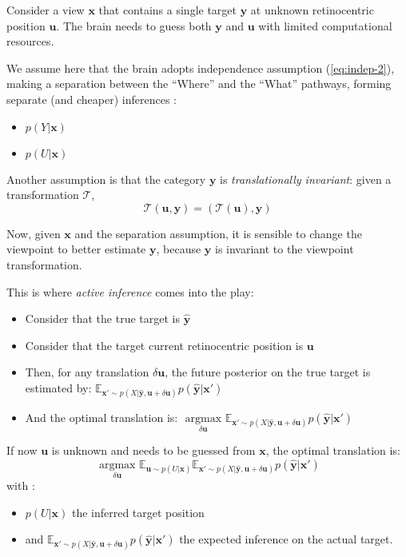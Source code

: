 Consider a view $\boldsymbol{x}$ that contains a single target $\boldsymbol{y}$ at unknown retinocentric position $\boldsymbol{u}$. The brain needs to guess both  $\boldsymbol{y}$ and $\boldsymbol{u}$ with limited computational resources.

We assume here that the brain adopts independence assumption (\ref{eq:indep-2}), making a separation between the ``Where'' and the ``What'' pathways, forming separate (and cheaper) inferences :
\begin{itemize}
\item $p(Y|\boldsymbol{x})$
\item $p(U|\boldsymbol{x})$
\end{itemize}

Another assumption is that the category $\boldsymbol{y}$ is \emph{translationally invariant}: given a transformation $\mathcal{T}$,
$$\mathcal{T}(\boldsymbol{u}, \boldsymbol{y})
= (\mathcal{T}(\boldsymbol{u}), \boldsymbol{y})$$

Now, given $\boldsymbol{x}$ and the separation assumption, it is sensible to change the viewpoint to better estimate $\boldsymbol{y}$, because  $\boldsymbol{y}$ is invariant to the viewpoint transformation.

This is where \emph{active inference} comes into the play:
\begin{itemize}
\item Consider that the true target is $\hat{\boldsymbol{y}}$
\item Consider that the target current retinocentric position is $\boldsymbol{u}$
\item Then, for any translation $\delta \boldsymbol{u}$, the future posterior on the true target is estimated by:
$\mathbb{E}_{\boldsymbol{x}'\sim p(X|\hat{\boldsymbol{y}}, \boldsymbol{u}+\delta \boldsymbol{u})} p(\hat{\boldsymbol{y}}|\boldsymbol{x}')$
\item And the optimal translation is:  $\underset{\delta\boldsymbol{u}}{\text{ argmax }}  \mathbb{E}_{\boldsymbol{x}'\sim p(X|\hat{\boldsymbol{y}}, \boldsymbol{u}+\delta \boldsymbol{u})} p(\hat{\boldsymbol{y}}|\boldsymbol{x}')$
\end{itemize}

If now $\boldsymbol{u}$ is unknown and needs to be guessed from $\boldsymbol{x}$, the optimal translation is:
$$\underset{\delta\boldsymbol{u}}{\text{ argmax }} \mathbb{E}_{\boldsymbol{u}\sim p(U|\boldsymbol{x})} \mathbb{E}_{\boldsymbol{x}'\sim p(X|\hat{\boldsymbol{y}}, \boldsymbol{u}+\delta \boldsymbol{u})} p(\hat{\boldsymbol{y}}|\boldsymbol{x}')$$
with :
\begin{itemize}
\item $p(U|\boldsymbol{x})$ the inferred target position
\item and $\mathbb{E}_{\boldsymbol{x}'\sim p(X|\hat{\boldsymbol{y}}, \boldsymbol{u}+\delta \boldsymbol{u})} p(\hat{\boldsymbol{y}}|\boldsymbol{x}')$ the expected inference on the actual target.
\end{itemize}

